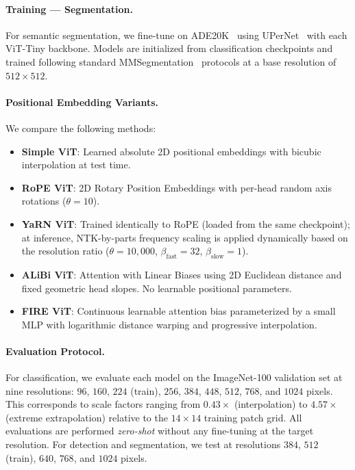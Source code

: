 \paragraph{Training --- Segmentation.}
For semantic segmentation, we fine-tune on ADE20K~\cite{zhou2017scene} using UPerNet~\cite{xiao2018unified} with each ViT-Tiny backbone. Models
are initialized from classification checkpoints and trained following standard MMSegmentation~\cite{mmseg2020}
protocols at a base resolution of $512 \times 512$.

\paragraph{Positional Embedding Variants.}
We compare the following methods:
\begin{itemize}
    \item \textbf{Simple ViT}: Learned absolute 2D positional embeddings with bicubic interpolation at test time.
    \item \textbf{RoPE ViT}: 2D Rotary Position Embeddings with per-head random axis rotations ($\theta = 10$).
    \item \textbf{YaRN ViT}: Trained identically to RoPE (loaded from the same checkpoint); at inference, NTK-by-parts frequency scaling is applied dynamically based on the resolution ratio ($\theta = 10{,}000$, $\beta_{\text{fast}} = 32$, $\beta_{\text{slow}} = 1$).
    \item \textbf{ALiBi ViT}: Attention with Linear Biases using 2D Euclidean distance and fixed geometric head slopes. No learnable positional parameters.
    \item \textbf{FIRE ViT}: Continuous learnable attention bias parameterized by a small MLP with logarithmic distance warping and progressive interpolation.
\end{itemize}

\paragraph{Evaluation Protocol.}
For classification, we evaluate each model on the ImageNet-100 validation set at nine resolutions:
$96$, $160$, $224$ (train), $256$, $384$, $448$, $512$, $768$, and $1024$ pixels. This corresponds
to scale factors ranging from $0.43\times$ (interpolation) to $4.57\times$ (extreme extrapolation)
relative to the $14 \times 14$ training patch grid. All evaluations are performed \emph{zero-shot}
without any fine-tuning at the target resolution. For detection and segmentation, we test at
resolutions $384$, $512$ (train), $640$, $768$, and $1024$ pixels.

